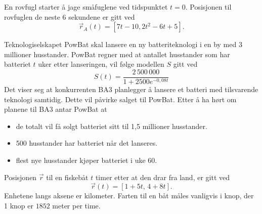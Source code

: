 En rovfugl starter å jage småfuglene ved tidspunktet
${t = 0}$. Posisjonen til rovfuglen de neste 6 sekundene er gitt ved
\[
\vec{r}_A(t) = [7t - 10, 2t^2 - 6t + 5].
\]

\newpage
{}
Teknologiselskapet PowBat skal lansere en ny batteriteknologi i en by med 3 millioner
husstander. PowBat regner med at antallet husstander som har batteriet $t$ uker etter
lanseringen, vil følge modellen $S$ gitt ved
\[ S(t) = \frac{2\,500\,000}{1 + 2500e^{-0{,}08t}} \]
Det viser seg at konkurrenten BA3 planlegger å lansere et batteri med tilsvarende teknologi
samtidig. Dette vil påvirke salget til PowBat.
Etter å ha hørt om planene til BA3 antar PowBat at
\begin{itemize}
	\item de totalt vil få solgt batteriet sitt til 1,5 millioner husstander.
	\item 500 husstander har batteriet når det lanseres.
	\item flest nye husstander kjøper batteriet i uke 60.
\end{itemize}

\newpage
{}
Posisjonen $\vec{r}$ til en fiskebåt $t$ timer etter at den drar fra land, er gitt ved
\[
\vec{r}(t) = [1 + 5t,\, 4 + 8t].
\]
Enhetene langs aksene er kilometer. Farten til en båt måles vanligvis i knop, der 1 knop er $1852$ meter per time.


